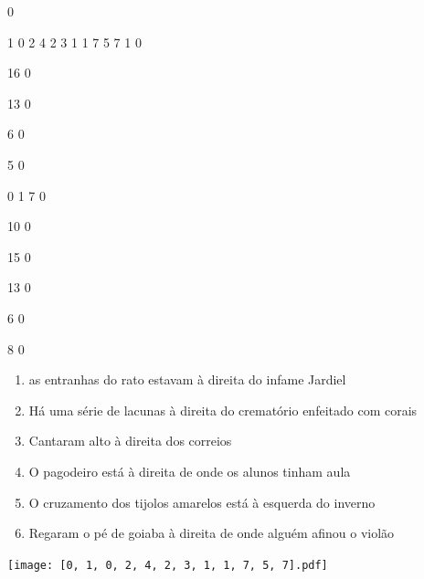 \documentclass[12pt]{article}
\begin{document}
		\vfill  
		  
{
	0	%

	1	%
	0	%
	2	%
	4	%
	2	%
	3	%
	1	%
	1	%
	7	%
	5	%
	7	%
	1	%
	0	%

	16	%
	0	%

	13	%
	0	%

	6	%
	0	%

	5	%
	0	%

	0	%
	1	%
	7	%
	0	%

	10	%
	0	%

	15	%
	0	%

	13	%
	0	%

	6	%
	0	%

	8	%
	0	%

}	  
		    	

		 

\pagebreak


	\begin{enumerate}
		  \sffamily %
		  \large %


\vfill \item
as entranhas do rato estavam	%
à direita
do infame Jardiel	%

\vfill \item
Há uma série de lacunas	%
à direita
do crematório enfeitado com corais	%

\vfill \item
Cantaram alto	%
à direita
dos correios	%

\vfill \item
O pagodeiro está	%
à direita
de onde os alunos tinham aula	%

\vfill \item
O cruzamento dos tijolos amarelos está	%
à esquerda
do inverno	%

\vfill \item
Regaram o pé de goiaba	%
à direita
de onde alguém afinou o violão	%
	\end{enumerate}
		  
		  \hfill

		  \vfill

\texttt{[image: [0, 1, 0, 2, 4, 2, 3, 1, 1, 7, 5, 7].pdf]}
\end{document}
